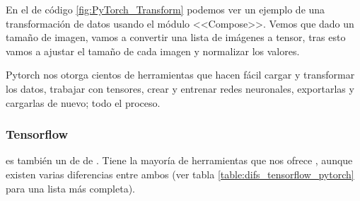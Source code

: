 En el  de código \ref{fig:PyTorch_Transform} podemos ver un ejemplo de una transformación de datos usando el módulo <<Compose>>. Vemos que dado un tamaño de imagen, vamos a convertir una lista de imágenes a tensor, tras esto vamos a ajustar el tamaño de cada imagen y normalizar los valores.


Pytorch nos otorga cientos de herramientas que hacen fácil cargar y transformar los datos, trabajar con tensores, crear y entrenar redes neuronales, exportarlas y cargarlas de nuevo; todo el proceso.

\subsubsection{Tensorflow}

 es también un  de  de . Tiene la mayoría de herramientas que nos ofrece , aunque existen varias diferencias entre ambos (ver tabla \ref{table:difs_tensorflow_pytorch} para una lista más completa).

